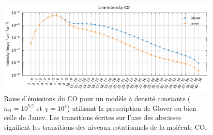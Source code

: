 \begin{appendices}
 \begin{figure}[!p]
    \centering
    \includegraphics[trim = {0 0 0 1cm },clip,width=1\textwidth]{figure/H2/bosse_dcte_janevVSglover/I_comp_CO.pdf}
    \caption{Raies d'émissions du $\mathrm{CO}$ pour un modèle à densité constante ($n_\mathrm{H} = 10^{5.5}$ et $\chi = 10^4$) utilisant la prescription de Glover ou bien celle de Janev. Les transitions écrites sur l'axe des abscisses signifient les transitions des niveaux rotationnels de la molécule $\mathrm{CO}$.}
    \label{fig:H2:bosse:ICO}
\end{figure}

\end{appendices}
